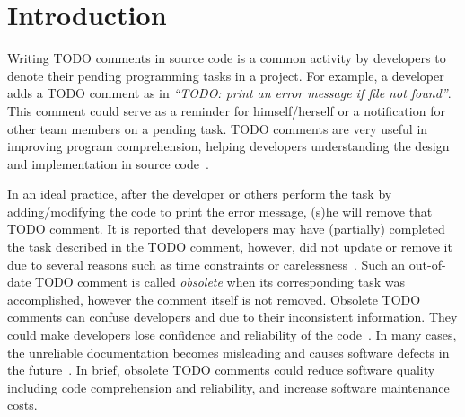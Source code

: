 \section{Introduction}
\label{intro:sec}

Writing TODO comments in source code is a common activity by
developers to denote their pending programming tasks in a project. For
example, a developer adds a TODO comment as in {\em ``TODO: print an
  error message if file not found''}. This comment could serve as a
reminder for himself/herself or a notification for other team members
on a pending task. TODO comments are very useful in improving
program comprehension, helping developers understanding the design
and implementation in source code~\cite{souza-sigdoc05,ying-msr05}.

In an ideal practice, after the developer or others perform the task
by adding/modifying the code to print the error message, (s)he will
remove that TODO comment.  It is reported that developers may have
(partially) completed the task described in the TODO comment, however,
did not update or remove it due to several reasons such as time
constraints or
carelessness~\cite{tdcleaner-fse21,wen-icpc19,icomment-sosp07}. Such
an out-of-date TODO comment is called {\em obsolete} when its
corresponding task was accomplished, however the comment itself is not
removed. Obsolete TODO comments can confuse developers and due to
their inconsistent information. They could make developers lose
confidence and reliability of the
code~\cite{tdcleaner-fse21,icomment-sosp07}. In many cases, the
unreliable documentation becomes misleading and causes software
defects in the future~\cite{icomment-sosp07,lintan-icse11}. In brief,
obsolete TODO comments could reduce software quality including code
comprehension and reliability, and increase software maintenance
costs.

